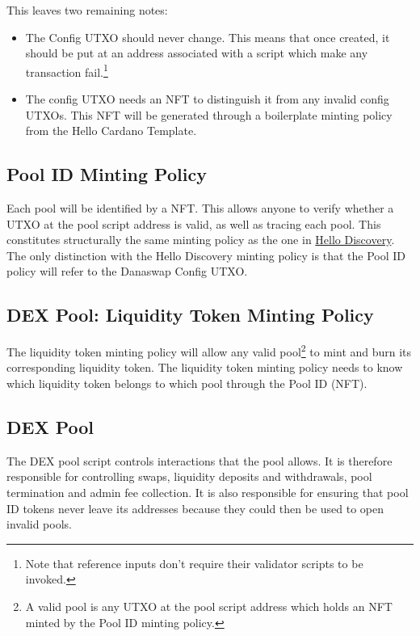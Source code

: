 \documentclass{article}
\begin{document}
This leaves two remaining notes:
\begin{itemize}
  \item The Config UTXO should never change. This means that once created, it
    should be put at an address associated with a script which make any
    transaction fail.\footnote{
      Note that reference inputs don't require their validator scripts to be
      invoked.}
  \item The config UTXO needs an NFT to distinguish it from any invalid config
    UTXOs. This NFT will be generated through a boilerplate minting policy from
    the Hello Cardano Template.
\end{itemize}

\subsection{Pool ID Minting Policy}

Each pool will be identified by a NFT. This allows anyone to verify whether a
UTXO at the pool script address is valid, as well as tracing each pool. This
constitutes structurally the same minting policy as the one in
\href{https://github.com/ArdanaLabs/cardano-app-template/blob/master/onchain/src/HelloDiscovery.hs}{
  Hello Discovery}.
The only distinction with the Hello Discovery minting policy is that the Pool ID
policy will refer to the Danaswap Config UTXO.

\subsection{DEX Pool: Liquidity Token Minting Policy}

The liquidity token minting policy will allow any valid pool\footnote{
  A valid pool is any UTXO at the pool script address which holds an NFT minted
  by the Pool ID minting policy.
} to mint and burn its corresponding liquidity token. The liquidity token
minting policy needs to know which liquidity token belongs to which pool through the
Pool ID (NFT).

\subsection{DEX Pool}

The DEX pool script controls interactions that the pool allows. It is therefore
responsible for controlling swaps, liquidity deposits and withdrawals, pool
termination and admin fee collection. It is also responsible for ensuring that
pool ID tokens never leave its addresses because they could then be used to open
invalid pools. \\
\end{document}
